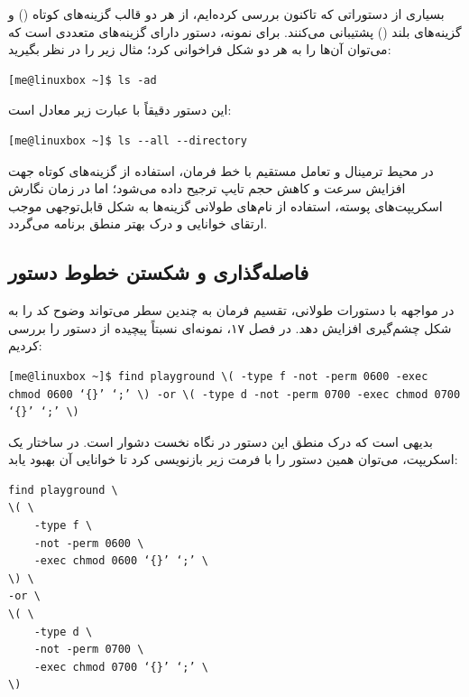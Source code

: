 بسیاری از دستوراتی که تاکنون بررسی کرده‌ایم، از هر دو قالب گزینه‌های کوتاه () و گزینه‌های بلند () پشتیبانی می‌کنند. برای نمونه، دستور  دارای گزینه‌های متعددی است که می‌توان آن‌ها را به هر دو شکل فراخوانی کرد؛ مثال زیر را در نظر بگیرید:

\begin{latin}
\begin{lstlisting}
[me@linuxbox ~]$ ls -ad
\end{lstlisting}
\end{latin}

این دستور دقیقاً با عبارت زیر معادل است:

\begin{latin}
\begin{lstlisting}
[me@linuxbox ~]$ ls --all --directory
\end{lstlisting}
\end{latin}

در محیط ترمینال و تعامل مستقیم با خط فرمان، استفاده از گزینه‌های کوتاه جهت افزایش سرعت و کاهش حجم تایپ ترجیح داده می‌شود؛ اما در زمان نگارش اسکریپت‌های پوسته، استفاده از نام‌های طولانی گزینه‌ها به شکل قابل‌توجهی موجب ارتقای خوانایی و درک بهتر منطق برنامه می‌گردد.

\subsection{فاصله‌گذاری و شکستن خطوط دستور}

در مواجهه با دستورات طولانی، تقسیم فرمان به چندین سطر می‌تواند وضوح کد را به شکل چشم‌گیری افزایش دهد. در فصل ۱۷، نمونه‌ای نسبتاً پیچیده از دستور  را بررسی کردیم:

\begin{latin}
\begin{lstlisting}
[me@linuxbox ~]$ find playground \( -type f -not -perm 0600 -exec chmod 0600 ‘{}’ ‘;’ \) -or \( -type d -not -perm 0700 -exec chmod 0700 ‘{}’ ‘;’ \)
\end{lstlisting}
\end{latin}

بدیهی است که درک منطق این دستور در نگاه نخست دشوار است. در ساختار یک اسکریپت، می‌توان همین دستور را با فرمت زیر بازنویسی کرد تا خوانایی آن بهبود یابد:

\begin{latin}
\begin{lstlisting}
find playground \
\( \
    -type f \
    -not -perm 0600 \
    -exec chmod 0600 ‘{}’ ‘;’ \
\) \
-or \
\( \
    -type d \
    -not -perm 0700 \
    -exec chmod 0700 ‘{}’ ‘;’ \
\)
\end{lstlisting}
\end{latin}

